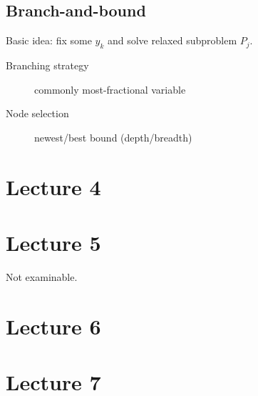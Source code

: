 \documentclass[a4paper,twocolumn,10pt]{article}
\begin{document}
\subsection{Branch-and-bound}
Basic idea: fix some $y_k$ and solve relaxed subproblem $P_j$.
\begin{description}
    \item[Branching strategy] commonly most-fractional variable
    \item[Node selection] newest/best bound (depth/breadth)
\end{description}

\section{Lecture 4}

\section{Lecture 5}

Not examinable.

\section{Lecture 6}

\section{Lecture 7}
\end{document}

